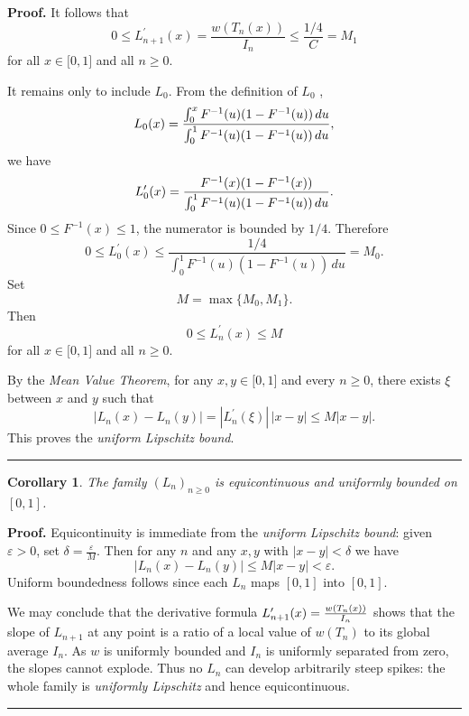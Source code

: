 \documentclass[onecolumn]{article}
\newtheorem{corollary}[theorem]{Corollary}
\newenvironment{proof}[1][Proof]{\noindent\textbf{#1.} }{\ \rule{0.5em}{0.5em}}
\begin{document}
\begin{proof}
\noindent It follows that 
\begin{equation}
0\leq L_{n+1}^{\prime }(x)=\frac{w(T_{n}(x))}{I_{n}}\leq \frac{1/4}{C}=M_{1}
\label{503}
\end{equation}%
for all $x\in \lbrack 0,1]$ and all $n\geq 0$.

\noindent It remains only to include $L_{0}$. From the definition of $L_{0}$%
, 
\begin{equation*}
L_{0}(x)=\frac{\int_{0}^{x}F^{-1}(u)(1-F^{-1}(u))\,du}{%
\int_{0}^{1}F^{-1}(u)(1-F^{-1}(u))\,du},
\end{equation*}%
we have 
\begin{equation*}
L_{0}^{\prime }(x)=\frac{F^{-1}(x)(1-F^{-1}(x))}{%
\int_{0}^{1}F^{-1}(u)(1-F^{-1}(u))\,du}.
\end{equation*}%
Since $0\leq F^{-1}(x)\leq 1$, the numerator is bounded by $1/4$. Therefore 
\begin{equation}
0\leq L_{0}^{\prime }(x)\leq \frac{1/4}{\int_{0}^{1}F^{-1}(u)(1-F^{-1}(u))%
\,du}=M_{0}.  \label{503a}
\end{equation}%
Set 
\begin{equation}
M=\max \{M_{0},M_{1}\}.  \label{503b}
\end{equation}%
Then 
\begin{equation*}
0\leq L_{n}^{\prime }(x)\leq M
\end{equation*}%
for all $x\in \lbrack 0,1]$ and all $n\geq 0$.

\noindent By the \textit{Mean Value Theorem}, for any $x,y\in \lbrack 0,1]$
and every $n\geq 0$, there exists $\xi $ between $x$ and $y$ such that 
\begin{equation}
|L_{n}(x)-L_{n}(y)|=|L_{n}^{\prime }(\xi )|\,|x-y|\leq M|x-y|.  \label{504}
\end{equation}%
This proves the \textit{uniform Lipschitz bound}. \hfill \hfill
\end{proof}

\begin{corollary}
The family $(L_{n})_{n\geq 0}$ is equicontinuous and uniformly bounded on $%
[0,1]$.
\end{corollary}

\begin{proof}
\noindent Equicontinuity is immediate from the \textit{uniform} \textit{%
Lipschitz bound}: given $\varepsilon >0$, set $\delta =\frac{\varepsilon }{M}
$. Then for any $n$ and any $x,y$ with $|x-y|<\delta $ we have 
\begin{equation}
|L_{n}(x)-L_{n}(y)|\leq M|x-y|<\varepsilon .  \label{505}
\end{equation}%
Uniform boundedness follows since each $L_{n}$ maps $[0,1]$ into $[0,1]$.
\hfill

We may conclude that the derivative formula $L_{n+1}^{\prime }(x)=\frac{%
w(T_{n}(x))}{I_{n}}$ shows that the slope of $L_{n+1}$ at any point is a
ratio of a local value of $w(T_{n})$ to its global average $I_{n}$. As $w$
is uniformly bounded and $I_{n}$ is uniformly separated from zero, the
slopes cannot explode. Thus no $L_{n}$ can develop arbitrarily steep spikes:
the whole family is \textit{uniformly Lipschitz} and hence equicontinuous.
\end{proof}
\end{document}
